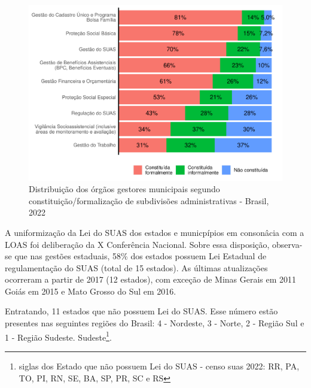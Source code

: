 \documentclass[
  brazilian]{report}
\begin{document}
\begin{figure}
\includegraphics{Censo-SUAS-2022_files/figure-latex/municipais-constituicao-subdivisoes-1} \caption[Distribuição dos órgãos gestores municipais segundo constituição/formalização de subdivisões administrativas - Brasil, 2022]{Distribuição dos órgãos gestores municipais segundo constituição/formalização de subdivisões administrativas - Brasil, 2022}\label{fig:municipais-constituicao-subdivisoes}
\end{figure}

A uniformização da Lei do SUAS dos estados e municpípios em consonâcia
com a LOAS foi deliberação da X Conferência Nacional. Sobre essa
disposição, observa-se que nas gestões estaduais, 58\% dos estados
possuem Lei Estadual de regulamentação do SUAS (total de 15 estados). As
últimas atualizações ocorreram a partir de 2017 (12 estados), com
exceção de Minas Gerais em 2011 Goiás em 2015 e Mato Grosso do Sul em
2016.

Entratando, 11 estados que não possuem Lei do SUAS. Esse número estão
presentes nas seguintes regiões do Brasil: 4 - Nordeste, 3 - Norte, 2 -
Região Sul e 1 - Região Sudeste.
Sudeste\footnote{ siglas dos Estado que não possuem Lei do SUAS - censo suas 2022: RR, PA, TO, PI, RN, SE, BA, SP, PR, SC e RS}.
\end{document}
